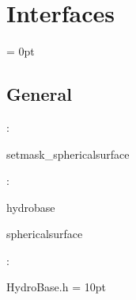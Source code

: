 
\section{Interfaces} 


\parskip = 0pt

\vspace{3mm} \subsection*{General}

: 

setmask\_sphericalsurface
\vspace{2mm}

: 

hydrobase

sphericalsurface
\vspace{2mm}

\vspace{5mm}

: 

HydroBase.h
\vspace{2mm}\parskip = 10pt 
